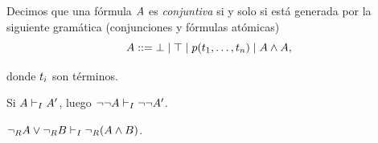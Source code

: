 \begin{definition}
    \label{fri:def:conjuntive}
    Decimos que una fórmula $A$ es \textit{conjuntiva} si y solo si está generada por la siguiente gramática (conjunciones y fórmulas atómicas)
    \[
        A ::=
            \bot \mid \top \mid p(t_1, \dots, t_n)
            \mid A \wedge A,
    \]

    donde $t_i$ son términos.
\end{definition}

\begin{lemma}
    \label{fri:lemma:dnegr-cong}
    Si $A \vdash_I A'$, luego $\neg \neg A \vdash_I \neg \neg A'$.
\end{lemma}

\begin{lemma}
    \label{fri:lemma:fnot-dist-over-and-right}
    \(
    \neg_R A \vee \neg_R B \vdash_I \neg_R(A \wedge B)
    \).
\end{lemma}

